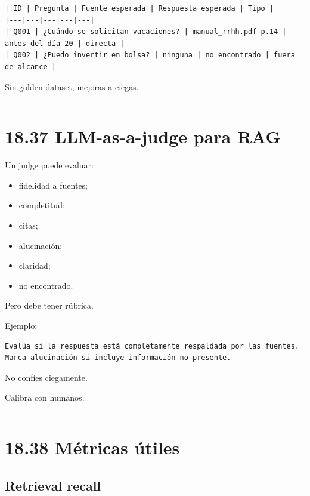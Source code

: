 \begin{lstlisting}
| ID | Pregunta | Fuente esperada | Respuesta esperada | Tipo |
|---|---|---|---|---|
| Q001 | ¿Cuándo se solicitan vacaciones? | manual_rrhh.pdf p.14 | antes del día 20 | directa |
| Q002 | ¿Puedo invertir en bolsa? | ninguna | no encontrado | fuera de alcance |
\end{lstlisting}

Sin golden dataset, mejoras a ciegas.

\begin{center}\rule{0.5\linewidth}{0.5pt}\end{center}

\section{18.37 LLM-as-a-judge para RAG}\label{llm-as-a-judge-para-rag}

Un judge puede evaluar:

\begin{itemize}
\tightlist
\item
  fidelidad a fuentes;
\item
  completitud;
\item
  citas;
\item
  alucinación;
\item
  claridad;
\item
  no encontrado.
\end{itemize}

Pero debe tener rúbrica.

Ejemplo:

\begin{lstlisting}
Evalúa si la respuesta está completamente respaldada por las fuentes.
Marca alucinación si incluye información no presente.
\end{lstlisting}

No confíes ciegamente.

Calibra con humanos.

\begin{center}\rule{0.5\linewidth}{0.5pt}\end{center}

\section{18.38 Métricas útiles}\label{muxe9tricas-uxfatiles}

\subsection{Retrieval recall}\label{retrieval-recall}

